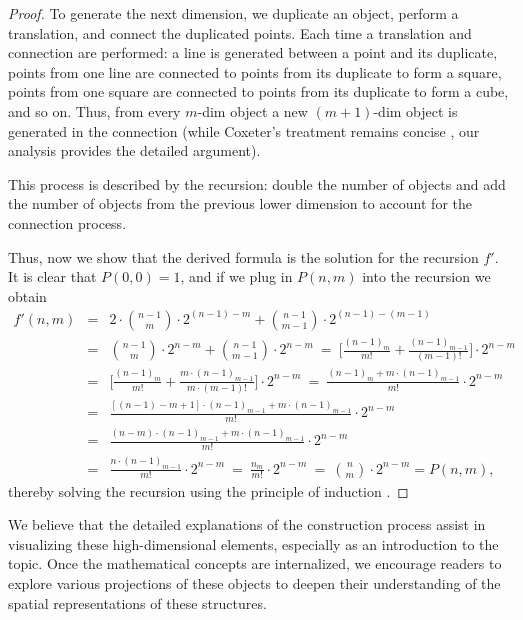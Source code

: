 \documentclass{article}
\begin{document}
	\begin{proof}
		To generate the next dimension, we duplicate an object, perform a translation, and connect the duplicated points. Each time a translation and connection are performed: a line is generated between a point and its duplicate, points from one line are connected to points from its duplicate to form a square, points from one square are connected to points from its duplicate to form a cube, and so on. Thus, from every $m$-dim object a new $(m+1)$-dim object is generated in the connection (while Coxeter’s treatment remains concise \cite{coxeter1973regular}, our analysis provides the detailed argument).
		
		This process is described by the recursion: double the number of objects and add the number of objects from the previous lower dimension to account for the connection process. 
		
		Thus, now we show that the derived formula is the solution for the recursion $f'$. It is clear that $P(0,0) = 1$, and if we plug in $P(n,m)$ into the recursion we obtain
		\begin{eqnarray*}
			f'(n,m) & = & 2 \cdot \binom{n-1}{m} \cdot 2^{(n-1)-m} + \binom{n-1}{m-1} \cdot 2^{(n-1)-(m-1)}\\
			& = & \binom{n-1}{m} \cdot 2^{n-m} + \binom{n-1}{m-1} \cdot 2^{n-m} \ = \ \Big[\frac{(n-1)_{m}}{m!} + \frac{(n-1)_{m-1}}{(m-1)!} \Big] \cdot 2^{n-m}\\
			& = & \Bigg[\frac{(n-1)_{m}}{m!} + \frac{m \cdot (n-1)_{m-1}}{m \cdot (m-1)!} \Bigg] \cdot 2^{n-m} \ = \ \frac{(n-1)_{m} + m \cdot (n-1)_{m-1}}{m!} \cdot 2^{n-m}\\
			& = & \frac{[(n-1) - m + 1] \cdot (n-1)_{m-1} + m \cdot (n-1)_{m-1}}{m!} \cdot 2^{n-m}\\
			& = & \frac{(n- m) \cdot (n-1)_{m-1} + m \cdot (n-1)_{m-1}}{m!} \cdot 2^{n-m}\\
			& = & \frac{n \cdot (n-1)_{m-1}}{m!} \cdot 2^{n-m} \ = \ \frac{n_{m}}{m!} \cdot 2^{n-m} \ = \ \binom{n}{m}\cdot2^{n-m} = P(n,m),
		\end{eqnarray*}
		thereby solving the recursion using the principle of induction \cite{rosen2011discrete}.
	\end{proof}

	We believe that the detailed explanations of the construction process assist in visualizing these high-dimensional elements, especially as an introduction to the topic. Once the mathematical concepts are internalized, we encourage readers to explore various projections of these objects to deepen their understanding of the spatial representations of these structures.
	
\end{document}
